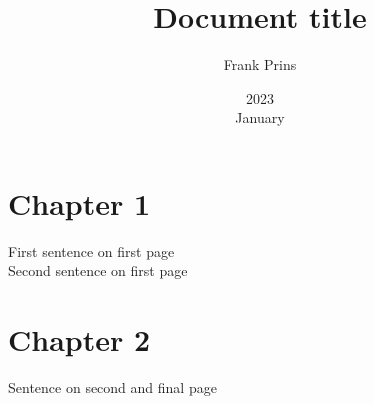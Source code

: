 \documentclass{article}
\title{Document title}
\date{2023\\ January}
\author{Frank Prins}
\begin{document}
    \maketitle
    \section{Chapter 1}
    First sentence on first page \\
    Second sentence on first page
    \pagebreak
    \section{Chapter 2}
    Sentence on second and final page
\end{document}
